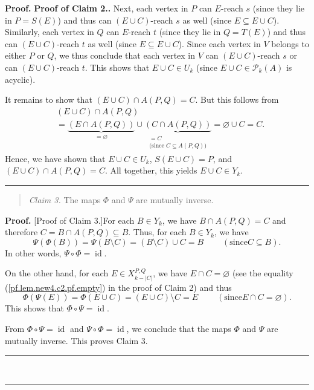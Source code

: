 \documentclass[numbers=enddot,12pt,final,onecolumn,notitlepage]{scrartcl}%
\theoremstyle{definition}
\newenvironment{statement}{\begin{quote}}{\end{quote}}
\newenvironment{proof}[1][Proof]{\noindent\textbf{#1.} }{\ \rule{0.5em}{0.5em}}
\theoremstyle{plainsl}
\begin{document}
\begin{proof}
\begin{proof}[Proof of Claim 2.]
    Next, each vertex in $P$ can $E$-reach $s$ (since they lie in $P = S(E)$) and thus can $(E \cup C)$-reach $s$ as well (since $E \subseteq E \cup C$). Similarly, each vertex in $Q$ can $E$-reach $t$ (since they lie in $Q = T(E)$) and thus can $(E \cup C)$-reach $t$ as well (since $E \subseteq E \cup C$). Since each vertex in $V$ belongs to either $P$ or $Q$, we thus conclude that each vertex in $V$ can $(E \cup C)$-reach $s$ or can $(E \cup C)$-reach $t$. This shows that $E \cup C \in U_{k}$ (since $E \cup C \in \mathcal{P}_{k}(A)$ is acyclic).

    It remains to show that $(E \cup C) \cap A(P,Q) = C$. But this follows from \begin{align*}
    &  \left(  E\cup C\right)  \cap A\left(  P,Q\right) \\
    &  =\underbrace{\left(  E\cap A\left(  P,Q\right)  \right)  }_{=\varnothing
    }\cup\underbrace{\left(  C\cap A\left(  P,Q\right)  \right)  }%
    _{\substack{=C\\\text{(since }C\subseteq A\left(  P,Q\right)  \text{)}%
    }}=\varnothing\cup C=C.
\end{align*} Hence, we have shown that $E \cup C \in U_{k}$, $S(E \cup C) = P$, and $(E \cup C) \cap A(P,Q) = C$. All together, this yields $E \cup C \in Y_{k}$.
\end{proof}

\begin{statement}
\textit{Claim 3.} The maps $\Phi$ and $\Psi$ are mutually inverse.
\end{statement}

\begin{proof}
[Proof of Claim 3.]For each $B\in Y_{k}$, we have $B\cap A\left(  P,Q\right)
=C$ and therefore $C=B\cap A\left(  P,Q\right)  \subseteq B$. Thus, for each
$B\in Y_{k}$, we have%
\[
\Psi\left(  \Phi\left(  B\right)  \right)  =\Psi\left(  B\setminus C\right)
=\left(  B\setminus C\right)  \cup C=B\ \ \ \ \ \ \ \ \ \ \left(  \text{since
}C\subseteq B\right)  .
\]
In other words, $\Psi\circ\Phi=\operatorname*{id}$.

On the other hand, for each $E\in X_{k-|C|}^{P,Q}$, we have $E\cap
C=\varnothing$ (see the equality (\ref{pf.lem.new4.c2.pf.empty}) in the proof
of Claim 2) and thus%
\[
\Phi\left(  \Psi\left(  E\right)  \right)  =\Phi\left(  E\cup C\right)
=\left(  E\cup C\right)  \setminus C=E\ \ \ \ \ \ \ \ \ \ \left(  \text{since
}E\cap C=\varnothing\right)  .
\]
This shows that $\Phi\circ\Psi=\operatorname*{id}$.

From $\Phi\circ\Psi=\operatorname*{id}$ and $\Psi\circ\Phi=\operatorname*{id}%
$, we conclude that the maps $\Phi$ and $\Psi$ are mutually inverse. This
proves Claim 3.
\end{proof}


\end{proof}
\end{document}
